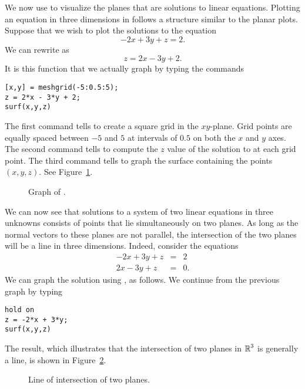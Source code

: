 \documentclass{ximera}
\begin{document}
We now use \Matlab to visualize the planes that are solutions to
linear equations.  Plotting an equation in three dimensions in
\Matlab follows a structure similar to the planar plots.
Suppose that we wish to plot the solutions to the equation
\begin{equation} \label{-2x+3y+z=2}
-2x+3y+z=2.
\end{equation}
We can rewrite  as
\[
z=2x-3y+2.
\]
It is this function that we actually graph by typing the
commands
\begin{verbatim}
[x,y] = meshgrid(-5:0.5:5);
z = 2*x - 3*y + 2;
surf(x,y,z)
\end{verbatim}   
The first command tells \Matlab to create a square grid in the
$xy$-plane.  Grid points are
equally spaced between $-5$ and $5$ at intervals of $0.5$ on
both the $x$ and $y$ axes. The second command tells \Matlab to
compute the $z$ value of the solution to  at
each grid point.  The third command tells \Matlab to graph the
surface containing the points $(x,y,z)$.  See
Figure~\ref{F:p1int}.

\begin{figure}[htb]
              \centerline{%
              }
              \caption{Graph of \protect{}.}
              \label{F:p1int}
\end{figure}


We can now see that solutions to a system of two linear
equations in three unknowns consists of points that lie
simultaneously on two planes.  As long as the normal vectors to
these planes are not parallel, the intersection of the two
planes will be a line in three dimensions.  Indeed, consider the
equations
\begin{eqnarray*}
-2x + 3y + z & = & 2 \\
 2x - 3y + z & = & 0.
\end{eqnarray*}
We can graph the solution using \Matlab, as follows. We continue
from the previous graph by typing
\begin{verbatim}
hold on
z = -2*x + 3*y;
surf(x,y,z)
\end{verbatim}
The result, which illustrates that the intersection of two planes
in $\mbox{$\Bbb{R}$}^3$ is generally a line, is shown in Figure~\ref{F:p2int}.

\begin{figure}[htb]
              \centerline{%
              }
              \caption{Line of intersection of two planes.}
              \label{F:p2int}
\end{figure}
\end{document}
